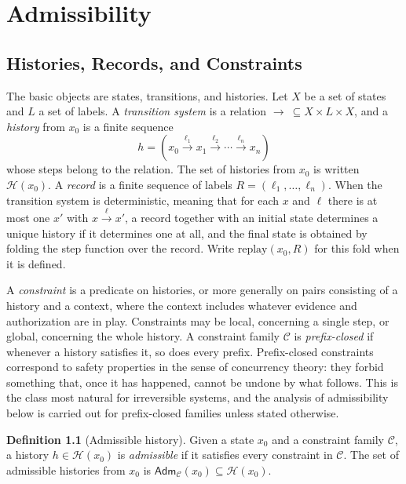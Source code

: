 \documentclass[11pt,twoside,openright]{book}
\theoremstyle{plain}
\theoremstyle{definition}
\newtheorem{definition}[theorem]{Definition}
\theoremstyle{remark}
\newcommand{\Hist}{\mathcal{H}}
\newcommand{\Adm}{\mathsf{Adm}}
\newcommand{\replay}{\mathrm{replay}}
\begin{document}
\chapter{Admissibility}
\label{ch:adm}

\section{Histories, Records, and Constraints}

The basic objects are states, transitions, and histories. Let $X$ be a set of states and $L$ a set of labels. A \emph{transition system} is a relation $\to\ \subseteq X\times L\times X$, and a \emph{history} from $x_0$ is a finite sequence
\[
h = (x_0 \xrightarrow{\ell_1} x_1 \xrightarrow{\ell_2} \cdots \xrightarrow{\ell_n} x_n)
\]
whose steps belong to the relation. The set of histories from $x_0$ is written $\Hist(x_0)$. A \emph{record} is a finite sequence of labels $R=(\ell_1,\dots,\ell_n)$. When the transition system is deterministic, meaning that for each $x$ and $\ell$ there is at most one $x'$ with $x\xrightarrow{\ell}x'$, a record together with an initial state determines a unique history if it determines one at all, and the final state is obtained by folding the step function over the record. Write $\replay(x_0,R)$ for this fold when it is defined.

A \emph{constraint} is a predicate on histories, or more generally on pairs consisting of a history and a context, where the context includes whatever evidence and authorization are in play. Constraints may be local, concerning a single step, or global, concerning the whole history. A constraint family $\mathcal{C}$ is \emph{prefix-closed} if whenever a history satisfies it, so does every prefix. Prefix-closed constraints correspond to safety properties in the sense of concurrency theory: they forbid something that, once it has happened, cannot be undone by what follows. This is the class most natural for irreversible systems, and the analysis of admissibility below is carried out for prefix-closed families unless stated otherwise.

\begin{definition}[Admissible history]
Given a state $x_0$ and a constraint family $\mathcal{C}$, a history $h\in\Hist(x_0)$ is \emph{admissible} if it satisfies every constraint in $\mathcal{C}$. The set of admissible histories from $x_0$ is $\Adm_{\mathcal{C}}(x_0)\subseteq\Hist(x_0)$.
\end{definition}
\end{document}
